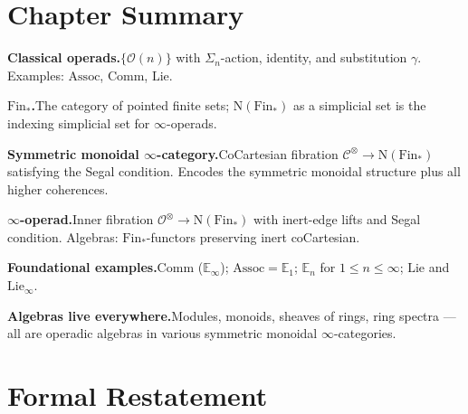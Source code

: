 \section*{Chapter Summary}

\begin{summarybox}
\textbf{Classical operads.}\quad $\{\mathcal{O}(n)\}$ with $\Sigma_n$-action,
identity, and substitution $\gamma$. Examples: $\mathrm{Assoc}$,
$\mathrm{Comm}$, $\mathrm{Lie}$.

\textbf{$\mathrm{Fin}_*$.}\quad The category of pointed finite sets;
$\mathrm{N}(\mathrm{Fin}_*)$ as a simplicial set is the indexing simplicial
set for $\infty$-operads.

\textbf{Symmetric monoidal $\infty$-category.}\quad CoCartesian fibration
$\mathcal{C}^\otimes \to \mathrm{N}(\mathrm{Fin}_*)$ satisfying the Segal
condition. Encodes the symmetric monoidal structure plus all higher
coherences.

\textbf{$\infty$-operad.}\quad Inner fibration $\mathcal{O}^\otimes \to
\mathrm{N}(\mathrm{Fin}_*)$ with inert-edge lifts and Segal condition.
Algebras: $\mathrm{Fin}_*$-functors preserving inert coCartesian.

\textbf{Foundational examples.}\quad $\mathrm{Comm}$ ($\mathbb{E}_\infty$);
$\mathrm{Assoc} = \mathbb{E}_1$; $\mathbb{E}_n$ for $1 \leq n \leq \infty$;
$\mathrm{Lie}$ and $\mathrm{Lie}_\infty$.

\textbf{Algebras live everywhere.}\quad Modules, monoids, sheaves of
rings, ring spectra — all are operadic algebras in various symmetric
monoidal $\infty$-categories.
\end{summarybox}


\section*{Formal Restatement}

